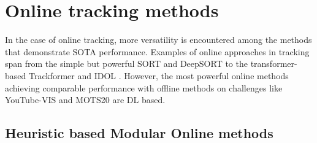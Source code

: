 \section{Online tracking methods}
In the case of online tracking, more versatility is encountered among the methods that demonstrate SOTA performance.
Examples of online approaches in tracking span from the simple but powerful SORT\parencite{sort} and DeepSORT \parencite{deepsort} to the transformer-based Trackformer \parencite{meinhardt2021trackformer} and IDOL \parencite{IDOL}. However, the most powerful online methods achieving comparable performance with offline methods on challenges like YouTube-VIS \parencite{Yang2019vis} and MOTS20 \parencite{mots20} are DL based.\par


\subsection{Heuristic based Modular Online methods}


